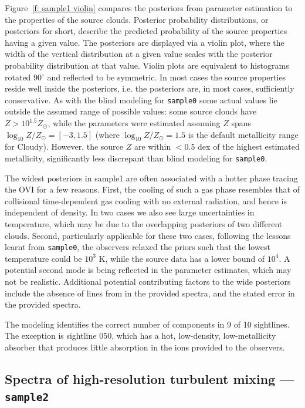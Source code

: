 \documentclass[fleqn,usenatbib]{mnras}
\begin{document}
Figure~\ref{f: sample1 violin} compares the posteriors from parameter estimation to the properties of the source clouds.
Posterior probability distributions, or posteriors for short, describe the predicted probability of the source properties having a given value.
The posteriors are displayed via a violin plot,
where the width of the vertical distribution at a given value scales with the posterior probability distribution at that value.
Violin plots are equivalent to histograms rotated 90$^\circ$ and reflected to be symmetric.
In most cases the source properties reside well inside the posteriors, i.e. the posteriors are, in most cases, sufficiently conservative.
As with the blind modeling for \texttt{sample0} some actual values lie outside the assumed range of possible values: 
some source clouds have $Z > 10^{1.5} Z_\odot$, while the parameters were estimated assuming $Z$ spans $\log_{10} Z/Z_\odot = [-3, 1.5]$ (where $\log_{10} Z/Z_\odot = 1.5$ is the default metallicity range for Cloudy).
However, the source $Z$ are within $< 0.5$ dex of the highest estimated metallicity, significantly less discrepant than blind modeling for \texttt{sample0}.

The widest posteriors in sample1 are often associated with a hotter phase tracing the OVI for a few reasons.
First, the cooling of such a gas phase resembles that of collisional time-dependent gas cooling with no external radiation, and hence is independent of density.
In two cases we also see large uncertainties in temperature, which may be due to the overlapping posteriors of two different clouds.
Second, particularly applicable for these two cases, following the lessons learnt from \texttt{sample0}, the observers relaxed the priors such that the lowest temperature could be $10^3$ K, while the source data has a lower bound of $10^4$.
A potential second mode is being reflected in the parameter estimates, which may not be realistic. 
Additional potential contributing factors to the wide posteriors include the absence of  lines from in the provided spectra, 
and the stated error in the provided spectra.

The modeling identifies the correct number of components in 9 of 10 sightlines.
The exception is sightline 050, which has a hot, low-density, low-metallicity absorber that produces little absorption in the ions provided to the observers.

\subsection{Spectra of high-resolution turbulent mixing --- \texttt{sample2}}
\label{s: results -- sample2}
\end{document}
